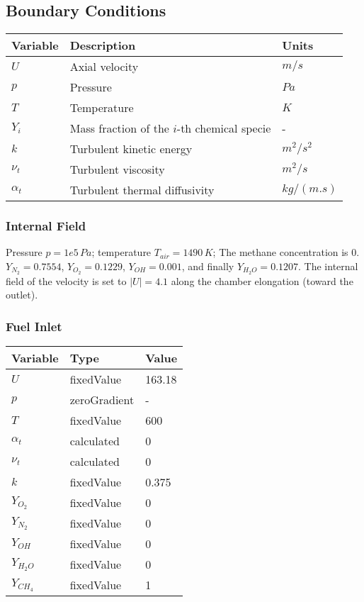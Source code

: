 \subsection*{Boundary Conditions}
\begin{table}[H]
    \centering
    \begin{tabular}{lll}
        \hline
        Variable & Description & Units \\ \hline
        $U$ & Axial velocity & $m/s$ \\
        $p$ & Pressure & $Pa$ \\
        $T$ & Temperature & $K$ \\
        $Y_i$ & Mass fraction of the $i$-th chemical specie & - \\
        $k$ & Turbulent kinetic energy & $m^2/s^2$ \\
        $\nu_t$ & Turbulent viscosity & $m^2/s$ \\
        $\alpha_t$ & Turbulent thermal diffusivity & $kg/(m.s)$ \\ \hline
    \end{tabular}
\end{table}

\subsubsection*{Internal Field}
Pressure $p = 1e5 \, Pa$; temperature $T_{air} = 1490 \, K$; The methane concentration is 0. $Y_{N_2} = 0.7554$, $Y_{O_2} = 0.1229$, $Y_{OH} = 0.001$, and finally $Y_{H_2O} = 0.1207$. The internal field of the velocity is set to $\left| U \right| = 4.1$ along the chamber elongation (toward the outlet).

\subsubsection*{Fuel Inlet}
\begin{table}[H]
    \centering
    \begin{tabular}{lll}
        \hline
        Variable & Type & Value \\ \hline
        $U$ & fixedValue & 163.18 \\
        $p$ & zeroGradient & - \\
        $T$ & fixedValue & 600 \\
        $\alpha_t$ & calculated & 0 \\
        $\nu_t$ & calculated & 0 \\
        $k$ & fixedValue & 0.375 \\
        $Y_{O_2}$ & fixedValue & 0 \\
        $Y_{N_2}$ & fixedValue & 0 \\
        $Y_{OH}$ & fixedValue & 0 \\
        $Y_{H_2O}$ & fixedValue & 0 \\
        $Y_{CH_4}$ & fixedValue & 1 \\ \hline
    \end{tabular}
\end{table}

